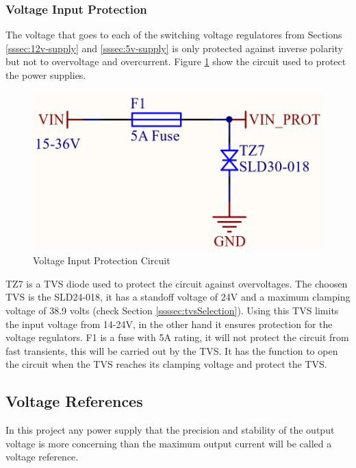 		\subsubsection{Voltage Input Protection}\label{sssec:voltage-input-protection}

			The voltage that goes to each of the switching voltage regulatores from Sections \ref{sssec:12v-supply} and \ref{sssec:5v-supply} is only protected against inverse polarity but not to overvoltage and overcurrent. Figure \ref{fig:input-protection-circuit} show the circuit used to protect the power supplies.

			\begin{figure}[htbp]
				\centering
					\includegraphics[scale=1]{figuras/fig-input-protection-circuit.png}
				\caption{Voltage Input Protection Circuit \cite{input-protection-circuit}}
				\label{fig:input-protection-circuit}
			\end{figure}

			TZ7 is a TVS diode used to protect the circuit against overvoltages. The choosen TVS is the SLD24-018, it has a standoff voltage of 24V and a maximum clamping voltage of 38.9 volts (check Section \ref{ssssec:tvsSelection}). Using this TVS limits the input voltage from 14-24V, in the other hand it ensures protection for the voltage regulators. F1 is a fuse with 5A rating, it will not protect the circuit from fast transients, this will be carried out by the TVS. It has the function to open the circuit when the TVS reaches its clamping voltage and protect the TVS.

	\subsection{Voltage References}\label{ssec:voltage-references}

		In this project any power supply that the precision and stability of the output voltage is more concerning than the maximum output current will be called a voltage reference.

